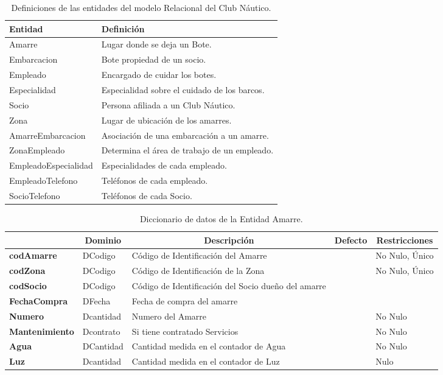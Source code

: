 \begin{table}[H]
\centering
\caption{Definiciones de las entidades del modelo Relacional del Club Náutico.}
\renewcommand{\arraystretch}{1.5}%
\label{tab-DiccR-3a}
\begin{tabular}{@{}ll@{}}
\toprule
\textbf{Entidad}  & \textbf{Definición}\\ \midrule
Amarre    & Lugar donde se deja un Bote. \\
Embarcacion  & Bote propiedad de un socio.\\
Empleado & Encargado de cuidar los botes.\\
Especialidad & Especialidad sobre el cuidado de los barcos.\\
Socio & Persona afiliada a un Club Náutico.\\
Zona & Lugar de ubicación de los amarres.\\
AmarreEmbarcacion & Asociación de una embarcación a un amarre. \\
ZonaEmpleado & Determina el área de trabajo de un empleado. \\
EmpleadoEspecialidad & Especialidades de cada empleado. \\
EmpleadoTelefono & Teléfonos de cada empleado. \\
SocioTelefono & Teléfonos de cada Socio. \\
\bottomrule
\end{tabular}
\end{table}

\begin{table}[H]
\centering
\caption{Diccionario de datos de la Entidad Amarre.}
\label{tab-DiccR-3b}
\begin{tabular}{>{\bfseries}m{4.0cm}>{}m{3.0cm}>{}m{6.0cm}>{}m{5.0cm}>{}m{2.0cm}}
\toprule
\multicolumn{1}{c}{\textbf{Atributo}} & \multicolumn{1}{c}{\textbf{Dominio}} & \multicolumn{1}{c}{\textbf{Descripción}} & \multicolumn{1}{c}{\textbf{Defecto}} & \multicolumn{1}{c}{\textbf{Restricciones}} \\ \midrule
codAmarre	&	DCodigo	&	Código de Identificación del Amarre	&		&	No Nulo, Único\\
codZona	&	DCodigo	&	Código de Identificación de la Zona	&		&	No Nulo, Único\\
codSocio	&	DCodigo	&	Código de Identificación del Socio dueño del amarre	&		&	\\
FechaCompra	&	DFecha	&	Fecha de compra del amarre	&		&	\\
Numero	&	Dcantidad	&	Numero del Amarre	&		&	No Nulo\\
Mantenimiento	&	Dcontrato	&	Si tiene contratado Servicios	&		&	No Nulo\\
Agua	&	DCantidad	&	Cantidad medida en el contador de Agua	&		&	No Nulo\\
Luz	&	Dcantidad	&	Cantidad medida en el contador de Luz	&		&	Nulo\\
\bottomrule
\end{tabular}
\end{table}

